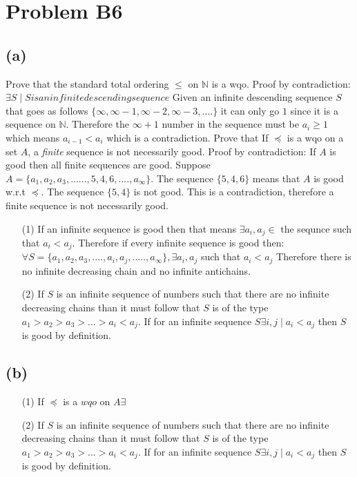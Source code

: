 \documentclass[12pt]{article}
\begin{document}
\section*{Problem B6}
\subsection*{(a)}
Prove that the standard total ordering $\leq$ on $\mathbb{N}$ is a wqo.
\newline
\indent
Proof by contradiction: $\exists S \mid S is an infinite descending sequence$
Given an infinite descending sequence $S$ that goes as follows
$\{\infty , \infty - 1, \infty -2, \infty-3, ....\}$ it can only go $1$
since it is a sequence on $\mathbb{N}$. Therefore the $\infty+1$ number in the
sequence must be $a_i \ge 1$ which means $a_{i-1} < a_i$
which is a contradiction.
\newline
Prove that If  $\preceq$ is a wqo on a set $A$, a {\it finite\/}
sequence is not  necessarily good.\newline
\indent Proof by contradiction:
If $A$ is good then all finite sequences are good.
Suppose $A = \{a_1 , a_2 , a_3 , ...... , 5 , 4 , 6 , .... , a_\infty\}$. 
The sequence $\{5,4,6\}$ means that $A$ is good w.r.t $\preceq$.
The sequence $\{5,4\}$ is not good.
This is a contradiction, therefore a finite sequence is not necessarily good.
\begin{enumerate}
\item[(1)]
If an infinite sequence is good then that means $\exists a_i,a_j \in$
the sequnce such that $a_i < a_j$. Therefore if every infinite sequence is
good then:
$\forall S = \{a_1 , a_2 , a_3 , .... , a_i , a_j , ..... , a_\infty\},
\exists a_i , a_j$ such that $a_i < a_j$
Therefore there is no infinite decreasing chain and no infinite antichains.
\item[(2)]
If $S$ is an infinite sequence of numbers such that there are no infinite
decreasing chains than it must follow that $S$ is of the type
$a_1 > a_2 > a_3 > ... > a_i < a_j$. If for an infinite sequence
$S \exists i , j \mid a_i < a_j$ then $S$ is good by definition.
\end{enumerate}
\subsection*{(b)}
\begin{enumerate}
\item[(1)]
If $\preceq$ is a $wqo$ on $A \exists $
\item[(2)]
If $S$ is an infinite sequence of numbers such that there are no
infinite decreasing chains than it must follow that $S$ is of the type
$a_1 > a_2 > a_3 > ... > a_i < a_j$.  If for an infinite sequence
$S \exists i , j \mid a_i < a_j$ then $S$ is good by definition.
\end{enumerate}
\end{document}
